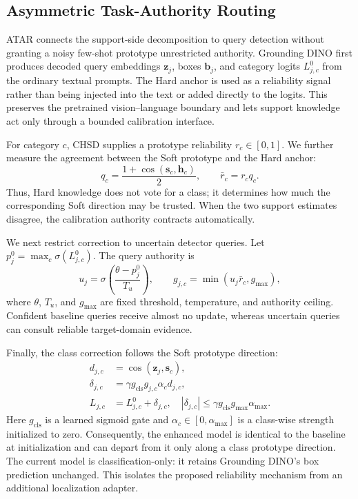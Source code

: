 \subsection{Asymmetric Task-Authority Routing}
\label{sec:atar}

ATAR connects the support-side decomposition to query detection without
granting a noisy few-shot prototype unrestricted authority. Grounding DINO
first produces decoded query embeddings $\mathbf z_j$, boxes $\mathbf b_j$,
and category logits $L^0_{j,c}$ from the ordinary textual prompts. The Hard
anchor is used as a reliability signal rather than being injected into the
text or added directly to the logits. This preserves the pretrained
vision--language boundary and lets support knowledge act only through a
bounded calibration interface.

For category $c$, CHSD supplies a prototype reliability $r_c\in[0,1]$. We
further measure the agreement between the Soft prototype and the Hard anchor:
\begin{equation}
q_c=\frac{1+\operatorname{cos}(\mathbf s_c,\mathbf h_c)}{2},
\qquad \bar r_c=r_c q_c.
\label{eq:hard_reliability}
\end{equation}
Thus, Hard knowledge does not vote for a class; it determines how much the
corresponding Soft direction may be trusted. When the two support estimates
disagree, the calibration authority contracts automatically.

We next restrict correction to uncertain detector queries. Let
$p_j^0=\max_c\sigma(L^0_{j,c})$. The query authority is
\begin{equation}
u_j=\sigma\!\left(\frac{\theta-p_j^0}{T_u}\right),
\qquad
g_{j,c}=\min(u_j\bar r_c,g_{\max}),
\label{eq:query_authority}
\end{equation}
where $\theta$, $T_u$, and $g_{\max}$ are fixed threshold, temperature, and
authority ceiling. Confident baseline queries receive almost no update,
whereas uncertain queries can consult reliable target-domain evidence.

Finally, the class correction follows the Soft prototype direction:
\begin{equation}
\begin{aligned}
d_{j,c}&=\operatorname{cos}(\mathbf z_j,\mathbf s_c),\\
\delta_{j,c}&=\gamma g_{\mathrm{cls}}g_{j,c}\alpha_c d_{j,c},\\
L_{j,c}&=L^0_{j,c}+\delta_{j,c},
\quad
|\delta_{j,c}|\leq
\gamma g_{\mathrm{cls}}g_{\max}\alpha_{\max}.
\end{aligned}
\label{eq:soft_classification}
\end{equation}
Here $g_{\mathrm{cls}}$ is a learned sigmoid gate and
$\alpha_c\in[0,\alpha_{\max}]$ is a class-wise strength initialized to zero.
Consequently, the enhanced model is identical to the baseline at
initialization and can depart from it only along a class prototype direction.
The current model is classification-only: it retains Grounding DINO's box
prediction unchanged. This isolates the proposed reliability mechanism from
an additional localization adapter.

